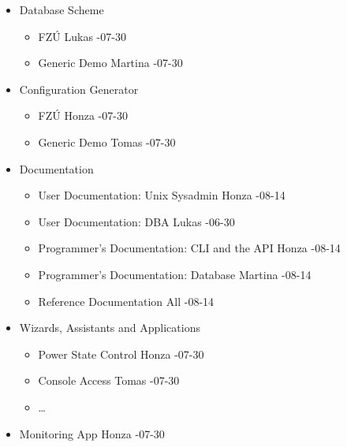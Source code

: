 \documentclass{article}
\begin{document}
\begin{itemize}
    \item Database Scheme
        \begin{itemize}
            \item FZÚ \tab Lukas -07-30
            \item Generic Demo \tab Martina -07-30
        \end{itemize}
    \item Configuration Generator
        \begin{itemize}
            \item FZÚ \tab Honza -07-30
            \item Generic Demo \tab Tomas -07-30
        \end{itemize}
    \item Documentation
        \begin{itemize}
            \item User Documentation: Unix Sysadmin \tab Honza -08-14
            \item User Documentation: DBA \tab Lukas -06-30
            \item Programmer's Documentation: CLI and the API \tab Honza -08-14
            \item Programmer's Documentation: Database \tab Martina -08-14
            \item Reference Documentation \tab All -08-14
        \end{itemize}
    \item Wizards, Assistants and Applications
        \begin{itemize}
            \item Power State Control \tab Honza -07-30
            \item Console Access \tab Tomas -07-30
            \item \ldots
        \end{itemize}
    \item Monitoring App \tab Honza -07-30
\end{itemize}
\end{document}
